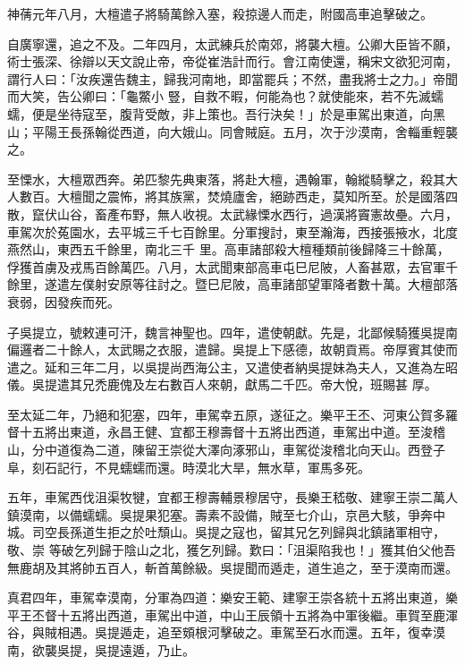 \begin{pinyinscope}
 神蒨元年八月，大檀遣子將騎萬餘入塞，殺掠邊人而走，附國高車追擊破之。



 自廣寧還，追之不及。二年四月，太武練兵於南郊，將襲大檀。公卿大臣皆不願，術士張深、徐辯以天文說止帝，帝從崔浩計而行。會江南使還，稱宋文欲犯河南，謂行人曰：「汝疾還告魏主，歸我河南地，即當罷兵；不然，盡我將士之力。」帝聞而大笑，告公卿曰：「龜鱉小
 豎，自救不暇，何能為也？就使能來，若不先滅蠕蠕，便是坐待寇至，腹背受敵，非上策也。吾行決矣！」於是車駕出東道，向黑山；平陽王長孫翰從西道，向大娥山。同會賊庭。五月，次于沙漠南，舍輜重輕襲之。



 至慄水，大檀眾西奔。弟匹黎先典東落，將赴大檀，遇翰軍，翰縱騎擊之，殺其大人數百。大檀聞之震怖，將其族黨，焚燒廬舍，絕跡西走，莫知所至。於是國落四散，竄伏山谷，畜產布野，無人收視。太武緣慄水西行，過漢將竇憲故壘。六月，車駕次於菟園水，去平城三千七百餘里。分軍搜討，東至瀚海，西接張掖水，北度燕然山，東西五千餘里，南北三千
 里。高車諸部殺大檀種類前後歸降三十餘萬，俘獲首虜及戎馬百餘萬匹。八月，太武聞東部高車屯巳尼陂，人畜甚眾，去官軍千餘里，遂遣左僕射安原等往討之。暨巳尼陂，高車諸部望軍降者數十萬。大檀部落衰弱，因發疾而死。



 子吳提立，號敕連可汗，魏言神聖也。四年，遣使朝獻。先是，北鄙候騎獲吳提南偏邏者二十餘人，太武賜之衣服，遣歸。吳提上下感德，故朝貢焉。帝厚賓其使而遣之。延和三年二月，以吳提尚西海公主，又遣使者納吳提妹為夫人，又進為左昭儀。吳提遣其兄禿鹿傀及左右數百人來朝，獻馬二千匹。帝大悅，班賜甚
 厚。



 至太延二年，乃絕和犯塞，四年，車駕幸五原，遂征之。樂平王丕、河東公賀多羅督十五將出東道，永昌王健、宜都王穆壽督十五將出西道，車駕出中道。至浚稽山，分中道復為二道，陳留王崇從大澤向涿邪山，車駕從浚稽北向天山。西登子阜，刻石記行，不見蠕蠕而還。時漠北大旱，無水草，軍馬多死。



 五年，車駕西伐沮渠牧犍，宜都王穆壽輔景穆居守，長樂王嵇敬、建寧王崇二萬人鎮漠南，以備蠕蠕。吳提果犯塞。壽素不設備，賊至七介山，京邑大駭，爭奔中城。司空長孫道生拒之於吐頹山。吳提之寇也，留其兄乞列歸與北鎮諸軍相守，敬、崇
 等破乞列歸于陰山之北，獲乞列歸。歎曰：「沮渠陷我也！」獲其伯父他吾無鹿胡及其將帥五百人，斬首萬餘級。吳提聞而遁走，道生追之，至于漠南而還。



 真君四年，車駕幸漠南，分軍為四道：樂安王範、建寧王崇各統十五將出東道，樂平王丕督十五將出西道，車駕出中道，中山王辰領十五將為中軍後繼。車賀至鹿渾谷，與賊相遇。吳提遁走，追至頞根河擊破之。車駕至石水而還。五年，復幸漠南，欲襲吳提，吳提遠遁，乃止。




\end{pinyinscope}
